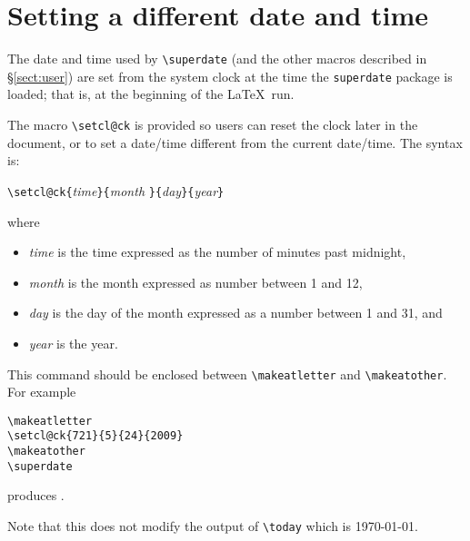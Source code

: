 \documentclass[12pt]{amsart}
\begin{document}
\section{Setting a different date and time}

The date and time used by \verb|\superdate| (and the other macros
described in \S\ref{sect:user}) are set from the system clock at the
time the \verb|superdate| package is loaded; that is, at the beginning
of the \LaTeX\ run.

The macro \verb|\setcl@ck| is provided so users can reset the clock
later in the document, or to set a date/time different from the
current date/time. The syntax is:

\noindent%
  \verb|\setcl@ck{|\emph{time}\verb|}{|\emph{month}%
    \verb|}{|\emph{day}\verb|}{|\emph{year}\verb|}|

\noindent where 
\begin{itemize}
\item \emph{time} is the  time expressed as the number of
  minutes past midnight,
\item \emph{month} is the month expressed as number between 1 and 12,
\item \emph{day} is the day of the month expressed as a number between
  1 and 31, and
\item \emph{year} is the year.
\end{itemize}
This command should be enclosed between \verb|\makeatletter| and
\verb|\makeatother|. For example
\begin{verbatim}
\makeatletter
\setcl@ck{721}{5}{24}{2009}
\makeatother
\superdate
\end{verbatim}
\makeatletter%
%
\makeatother%
\renewcommand\superdateseparator{:}%
produces \superdate.

Note that this does not modify the output of \verb|\today| which is \today.
\end{document}
